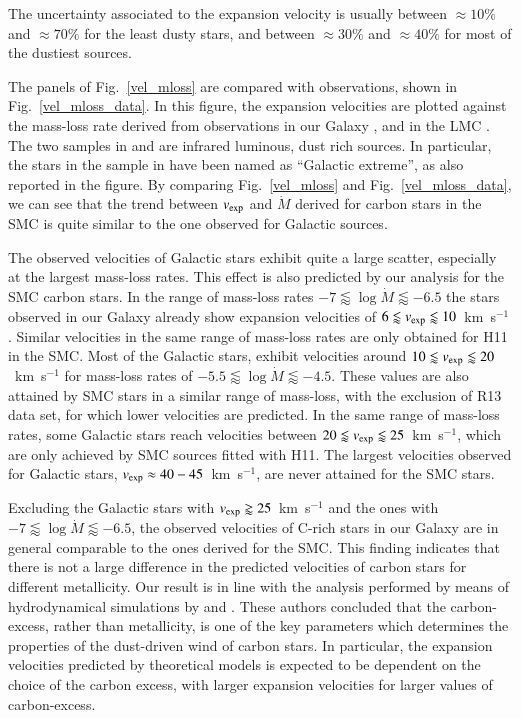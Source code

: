 \documentclass[useAMS,usenatbib]{mn2e/mn2e}
\begin{document}
{The uncertainty associated to the expansion velocity is usually between $\approx10\%$ and $\approx70\%$ for the least dusty stars, and between $\approx30\%$ and $\approx40\%$ for most of the dustiest sources.

The panels of Fig.~\ref{vel_mloss} are compared with observations, shown in Fig.~\ref{vel_mloss_data}. In this figure, the expansion velocities are plotted against the mass-loss rate derived from observations in our Galaxy \citep[][Table 4, and references therein]{Schoier01,Groenewegen02,RamstedtOlofsson_14, Danilovich_etal15, Groenewegen16}, and in the LMC \citep{Groenewegen16}.
The two samples in \citet{Groenewegen02} and \citet[][Table 4]{Groenewegen16} are infrared luminous, dust rich sources. In particular, the stars in the sample in \citet[][Table 4]{Groenewegen16} have been named as ``Galactic extreme'', as also reported in the figure.
By comparing Fig.~\ref{vel_mloss} and  Fig.~\ref{vel_mloss_data}, we can see that the trend between $v_{\rm exp}$ and $\dot{M}$ derived for carbon stars in the SMC is quite similar to the one observed for Galactic sources. 

The observed velocities of Galactic stars exhibit quite a large scatter, especially at the largest mass-loss rates. This effect is also predicted by our analysis for the SMC carbon stars.
In the range of mass-loss rates $-7\lessapprox\log\dot{M}\lessapprox-6.5$ the stars observed in our Galaxy already show expansion velocities of $6\lessapprox v_{\rm exp}\lessapprox10$~km~s$^{-1}$. Similar velocities in the same range of mass-loss rates are only obtained for H11 in the SMC. Most of the Galactic stars, exhibit velocities around $10\lessapprox v_{\rm exp}\lessapprox20$~km~s$^{-1}$ for mass-loss rates of $-5.5\lessapprox\log\dot{M}\lessapprox-4.5$. These values are also attained by SMC stars in a similar range of mass-loss, with the exclusion of R13 data set, for which lower velocities are predicted. In the same range of mass-loss rates, some Galactic stars reach velocities between $20\lessapprox v_{\rm exp}\lessapprox25$~km~s$^{-1}$, which are only achieved by SMC sources fitted with H11.
The largest velocities observed for Galactic stars, $v_{\rm exp}\approx40-45$~km~s$^{-1}$, are never attained for the SMC stars.

Excluding the Galactic stars with $v_{\rm exp}\gtrapprox 25$~km~s$^{-1}$ and the ones with $-7\lessapprox\log\dot{M}\lessapprox-6.5$, the observed velocities of C-rich stars in our Galaxy are in general comparable to the ones derived for the SMC. This finding indicates that there is not a large difference in the predicted velocities of carbon stars for different metallicity. Our result is in line with the analysis performed by means of hydrodynamical simulations  by \citet{Mattsson10} and \citet{Eriksson14}. These authors concluded that the carbon-excess, rather than metallicity, is one of the key parameters which determines the properties of the dust-driven wind of carbon stars. In particular, the expansion velocities predicted by theoretical models is expected to be dependent on the choice of the carbon excess, with larger expansion velocities for larger values of carbon-excess.

}
\end{document}
